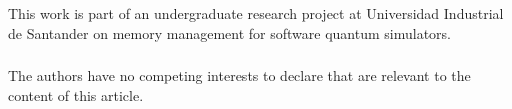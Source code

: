 \documentclass[runningheads]{llncs}
\begin{document}
\begin{credits}
\subsubsection{\ackname}
This work is part of an undergraduate research project at Universidad Industrial de Santander on memory management for software quantum simulators.

\subsubsection{\discintname}
The authors have no competing interests to declare that are relevant to the content of this article.
\end{credits}



\end{document}
